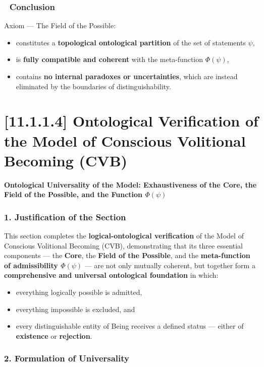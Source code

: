 \documentclass[12pt]{article}
\begin{document}
\subsubsection*{🔹 Conclusion}

Axiom \text{[4]} — The Field of the Possible:

\begin{itemize}
\item constitutes a \textbf{topological ontological partition} of the set of statements $\psi$,
\item is \textbf{fully compatible and coherent} with the meta-function $\Phi(\psi)$,
\item contains \textbf{no internal paradoxes or uncertainties}, which are instead eliminated by the boundaries of distinguishability.
\end{itemize}

\section*{[11.1.1.4] Ontological Verification of the Model of Conscious Volitional Becoming (CVB)}

\textbf{Ontological Universality of the Model: Exhaustiveness of the Core, the Field of the Possible, and the Function $\Phi(\psi)$}

\subsubsection*{1. Justification of the Section}

This section completes the \textbf{logical-ontological verification} of the Model of Conscious Volitional Becoming (CVB), demonstrating that its three essential components — the \textbf{Core}, the \textbf{Field of the Possible}, and the \textbf{meta-function of admissibility $\Phi(\psi)$} — are not only mutually coherent, but together form a \textbf{comprehensive and universal ontological foundation} in which:

\begin{itemize}
\item everything logically possible is admitted,
\item everything impossible is excluded, and
\item every distinguishable entity of Being receives a defined status — either of \textbf{existence} or \textbf{rejection}.
\end{itemize}

\subsubsection*{2. Formulation of Universality}
\end{document}
